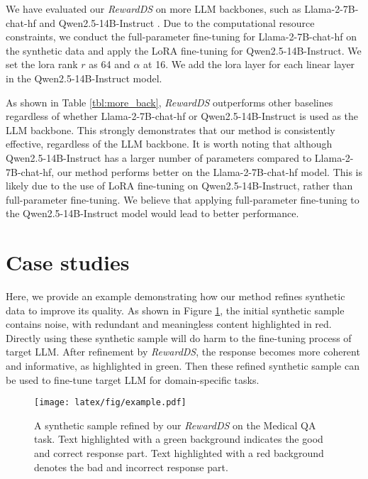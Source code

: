 We have evaluated our \textit{RewardDS} on more LLM backbones, such as Llama-2-7B-chat-hf \cite{metaai2023llama2} and Qwen2.5-14B-Instruct \cite{yang2024qwen2}.
Due to the computational resource constraints, we conduct the full-parameter fine-tuning for Llama-2-7B-chat-hf on the synthetic data and apply the LoRA fine-tuning \cite{edward2022lora} for Qwen2.5-14B-Instruct.
We set the lora rank $r$ as 64 and $\alpha$ at 16.
We add the lora layer for each linear layer in the Qwen2.5-14B-Instruct model.

As shown in Table \ref{tbl:more_back}, \textit{RewardDS} outperforms other baselines regardless of whether Llama-2-7B-chat-hf or Qwen2.5-14B-Instruct is used as the LLM backbone. 
This strongly demonstrates that our method is consistently effective, regardless of the LLM backbone. 
It is worth noting that although Qwen2.5-14B-Instruct has a larger number of parameters compared to Llama-2-7B-chat-hf, our method performs better on the Llama-2-7B-chat-hf model. 
This is likely due to the use of LoRA fine-tuning on Qwen2.5-14B-Instruct, rather than full-parameter fine-tuning. 
We believe that applying full-parameter fine-tuning to the Qwen2.5-14B-Instruct model would lead to better performance.

\section{Case studies}
\label{app:case}
Here, we provide an example demonstrating how our method refines synthetic data to improve its quality.
As shown in Figure \ref{fig:training_samples}, the initial synthetic sample contains noise, with redundant and meaningless content highlighted in red.
Directly using these synthetic sample will do harm to the fine-tuning process of target LLM.
After refinement by \textit{RewardDS}, the response becomes more coherent and informative, as highlighted in green.
Then these refined synthetic sample can be used to fine-tune target LLM for domain-specific tasks.

\begin{figure}[h]
  \centering
  \raggedleft
    \begin{minipage}{0.98\columnwidth}
    \texttt{[image: latex/fig/example.pdf]}
    \label{fig:training_samples_legend}
  \end{minipage}
  \vspace{-1.5em}
  \caption{A synthetic sample refined by our \textit{RewardDS} on the Medical QA task. Text highlighted with a green background indicates the good and correct response part. Text highlighted with a red background denotes the bad and incorrect response part. }
  \label{fig:training_samples}
\end{figure}

